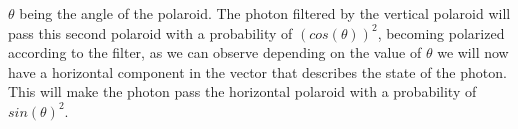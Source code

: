 $\theta$ being the angle of the polaroid. The photon filtered by the vertical polaroid will pass this second polaroid with a probability of $(cos(\theta))^{2}$, becoming polarized according to the filter, as we can observe depending on the value of $\theta$ we will now have a horizontal component in the vector that describes the state of the photon. This will make the photon pass the horizontal polaroid  with a probability of $sin(\theta)^{2}$. 




















